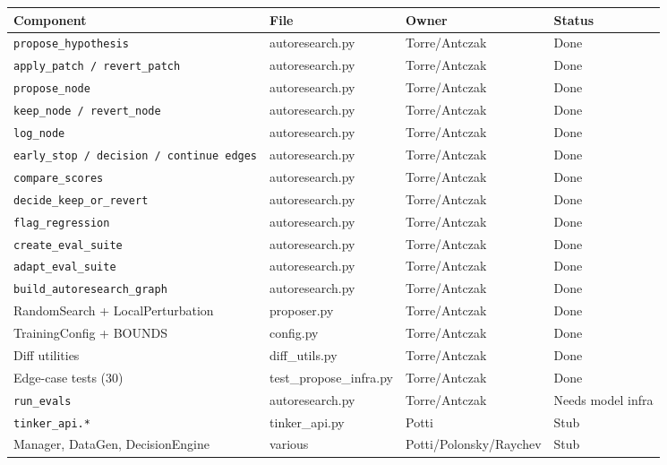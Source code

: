\documentclass[11pt, letterpaper]{article}
\begin{document}
\begin{center}
\begin{tabular}{llll}
\hline
\textbf{Component} & \textbf{File} & \textbf{Owner} & \textbf{Status} \\
\hline
\texttt{propose\_hypothesis}         & autoresearch.py  & Torre/Antczak & \textcolor{success}{Done} \\
\texttt{apply\_patch / revert\_patch} & autoresearch.py  & Torre/Antczak & \textcolor{success}{Done} \\
\texttt{propose\_node}               & autoresearch.py  & Torre/Antczak & \textcolor{success}{Done} \\
\texttt{keep\_node / revert\_node}   & autoresearch.py  & Torre/Antczak & \textcolor{success}{Done} \\
\texttt{log\_node}                   & autoresearch.py  & Torre/Antczak & \textcolor{success}{Done} \\
\texttt{early\_stop / decision / continue edges} & autoresearch.py & Torre/Antczak & \textcolor{success}{Done} \\
\texttt{compare\_scores}             & autoresearch.py  & Torre/Antczak & \textcolor{success}{Done} \\
\texttt{decide\_keep\_or\_revert}    & autoresearch.py  & Torre/Antczak & \textcolor{success}{Done} \\
\texttt{flag\_regression}            & autoresearch.py  & Torre/Antczak & \textcolor{success}{Done} \\
\texttt{create\_eval\_suite}         & autoresearch.py  & Torre/Antczak & \textcolor{success}{Done} \\
\texttt{adapt\_eval\_suite}          & autoresearch.py  & Torre/Antczak & \textcolor{success}{Done} \\
\texttt{build\_autoresearch\_graph}  & autoresearch.py  & Torre/Antczak & \textcolor{success}{Done} \\
RandomSearch + LocalPerturbation     & proposer.py      & Torre/Antczak & \textcolor{success}{Done} \\
TrainingConfig + BOUNDS              & config.py        & Torre/Antczak & \textcolor{success}{Done} \\
Diff utilities                       & diff\_utils.py   & Torre/Antczak & \textcolor{success}{Done} \\
Edge-case tests (30)                 & test\_propose\_infra.py & Torre/Antczak & \textcolor{success}{Done} \\
\hline
\texttt{run\_evals}                  & autoresearch.py  & Torre/Antczak & \textcolor{warning}{Needs model infra} \\
\texttt{tinker\_api.*}               & tinker\_api.py   & Potti         & \textcolor{warning}{Stub} \\
Manager, DataGen, DecisionEngine     & various          & Potti/Polonsky/Raychev & \textcolor{warning}{Stub} \\
\hline
\end{tabular}
\end{center}
\end{document}
